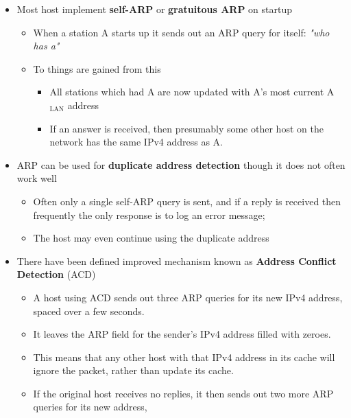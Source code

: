 \documentclass[11pt]{article}
\providecommand{\tightlist}{%
      \setlength{\itemsep}{0pt}\setlength{\parskip}{0pt}}
\begin{document}
\begin{itemize}
\tightlist
\item
  Most host implement \textbf{self-ARP} or \textbf{gratuitous ARP} on
  startup

  \begin{itemize}
  \tightlist
  \item
    When a station A starts up it sends out an ARP query for itself:
    \emph{"who has a"}
  \item
    To things are gained from this

    \begin{itemize}
    \tightlist
    \item
      All stations which had A are now updated with A's most current
      A\(_\text{LAN}\) address
    \item
      If an answer is received, then presumably some other host on the
      network has the same IPv4 address as A.
    \end{itemize}
  \end{itemize}
\item
  ARP can be used for \textbf{duplicate address detection} though it
  does not often work well

  \begin{itemize}
  \tightlist
  \item
    Often only a single self-ARP query is sent, and if a reply is
    received then frequently the only response is to log an error
    message;
  \item
    The host may even continue using the duplicate address
  \end{itemize}
\item
  There have been defined improved mechanism known as \textbf{Address
  Conflict Detection} (ACD)

  \begin{itemize}
  \tightlist
  \item
    A host using ACD sends out three ARP queries for its new IPv4
    address, spaced over a few seconds.
  \item
    It leaves the ARP field for the sender's IPv4 address filled with
    zeroes.
  \item
    This means that any other host with that IPv4 address in its cache
    will ignore the packet, rather than update its cache.
  \item
    If the original host receives no replies, it then sends out two more
    ARP queries for its new address,


\end{itemize}
\end{itemize}
\end{document}
